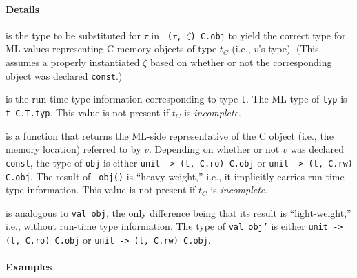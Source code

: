 \documentclass[titlepage,letterpaper]{article}
\begin{document}
\paragraph*{Details}

\begin{description}\setlength{\itemsep}{0pt}
\item[{\tt type t}] is the type to be substituted for $\tau$ in {\tt
    ($\tau$, $\zeta$) C.obj} to yield the correct type for ML values
  representing C memory objects of type $t_C$ (i.e., $v$'s type).
  (This assumes a properly instantiated $\zeta$ based on whether or
  not the corresponding object was declared {\tt const}.)
\item[!{\tt val typ}] is the run-time type information corresponding
  to type {\tt t}.  The ML type of {\tt typ} is {\tt t C.T.typ}.  This
  value is not present if $t_C$ is {\em incomplete}.
\item[!{\tt val obj}] is a function that returns the ML-side
  representative of the C object (i.e., the memory location) referred
  to by $v$.  Depending on whether or not $v$ was declared {\tt
    const}, the type of {\tt obj} is either {\tt unit -> (t, C.ro)
    C.obj} or {\tt unit -> (t, C.rw) C.obj}.  The result of {\tt
    obj()} is ``heavy-weight,'' i.e., it implicitly carries run-time
  type information.  This value is not present if $t_C$ is {\em
    incomplete}.
\item[{\tt val obj'}] is analogous to {\tt val obj}, the only
  difference being that its result is ``light-weight,'' i.e., without
  run-time type information.  The type of {\tt val obj'} is
  either {\tt unit -> (t, C.ro) C.obj} or {\tt unit -> (t, C.rw) C.obj}.
\end{description}

\paragraph*{Examples}
\end{document}
